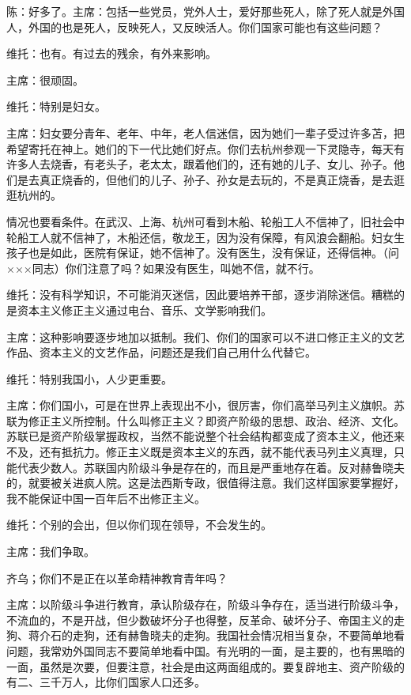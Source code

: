 陈：好多了。主席：包括一些党员，党外人士，爱好那些死人，除了死人就是外国人，外国的也是死人，反映死人，又反映活人。你们国家可能也有这些问题？

维托：也有。有过去的残余，有外来影响。

主席：很顽固。

维托：特别是妇女。

主席：妇女要分青年、老年、中年，老人信迷信，因为她们一辈子受过许多苫，把希望寄托在神上。她们的下一代比她们好点。你们去杭州参观一下灵隐寺，每天有许多人去烧香，有老头子，老太太，跟着他们的，还有她的儿子、女儿、孙子。他们是去真正烧香的，但他们的儿子、孙子、孙女是去玩的，不是真正烧香，是去逛逛杭州的。

情况也要看条件。在武汉、上海、杭州可看到木船、轮船工人不信神了，旧社会中轮船工人就不信神了，木船还信，敬龙王，因为没有保障，有风浪会翻船。妇女生孩子也是如此，医院有保证，她不信神了。没有医生，没有保证，还得信神。（问×××同志）你们注意了吗？如果没有医生，叫她不信，就不行。

维托：没有科学知识，不可能消灭迷信，因此要培养干部，逐步消除迷信。糟糕的是资本主义修正主义通过电台、音乐、文学影响我们。

主席：这种影响要逐步地加以抵制。我们、你们的国家可以不进口修正主义的文艺作品、资本主义的文艺作品，问题还是我们自己用什么代替它。

维托：特别我国小，人少更重要。

主席：你们国小，可是在世界上表现出不小，很厉害，你们高举马列主义旗帜。苏联为修正主义所控制。什么叫修正主义？即资产阶级的思想、政治、经济、文化。苏联已是资产阶级掌握政权，当然不能说整个社会结构都变成了资本主义，他还来不及，还有抵抗力。修正主义既是资本主义的东西，就不能代表马列主义真理，只能代表少数人。苏联国内阶级斗争是存在的，而且是严重地存在着。反对赫鲁晓夫的，就要被关进疯人院。这是法西斯专政，很值得注意。我们这样国家要掌握好，我不能保证中国一百年后不出修正主义。

维托：个别的会出，但以你们现在领导，不会发生的。

主席：我们争取。

齐乌；你们不是正在以革命精神教育青年吗？

主席：以阶级斗争进行教育，承认阶级存在，阶级斗争存在，适当进行阶级斗争，不流血的，不是开战，但少数破坏分子也得整，反革命、破坏分子、帝国主义的走狗、蒋介石的走狗，还有赫鲁晓夫的走狗。我国社会情况相当复杂，不要简单地看问题，我常劝外国同志不要简单地看中国。有光明的一面，是主要的，也有黑暗的一面，虽然是次要，但要注意，社会是由这两面组成的。要复辟地主、资产阶级的有二、三千万人，比你们国家人口还多。

